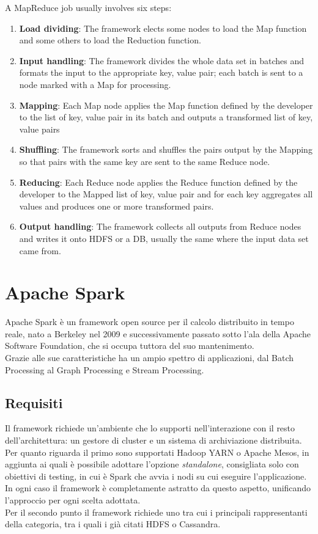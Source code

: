 A MapReduce job usually involves six steps:

\begin{enumerate}
	\item \textbf{Load dividing}: The framework elects some nodes to load the Map function and some others to load the Reduction function.
	\item \textbf{Input handling}: The framework divides the whole data set in batches and formats the input to the appropriate key, value pair; each batch is sent to a node marked with a Map for processing.
	\item \textbf{Mapping}: Each Map node applies the Map function defined by the developer to the list of key, value pair in its batch and outputs a transformed list of key, value pairs
	\item \textbf{Shuffling}: The framework sorts and shuffles the pairs output by the Mapping so that pairs with the same key are sent to the same Reduce node.
	\item \textbf{Reducing}: Each Reduce node applies the Reduce function defined by the developer to the Mapped list of key, value pair and for each key aggregates all values and produces one or more transformed pairs.
	\item \textbf{Output handling}: The framework collects all outputs from Reduce nodes and writes it onto HDFS or a DB, usually the same where the input data set came from.
\end{enumerate}

 \pagebreak
 
\section{Apache Spark} \label{Spark}

Apache Spark è un framework open source per il calcolo distribuito in tempo reale, nato a Berkeley nel 2009 e successivamente passato sotto l'ala della Apache Software Foundation, che si occupa tuttora del suo mantenimento.\\ Grazie alle sue caratteristiche ha un ampio spettro di applicazioni, dal Batch Processing al Graph Processing e Stream Processing.
\subsection{Requisiti} 
Il framework richiede un'ambiente che lo supporti nell'interazione con il resto dell'architettura: un gestore di cluster e un sistema di archiviazione distribuita.\\ 
Per quanto riguarda il primo sono supportati Hadoop YARN o Apache Mesos, in aggiunta ai quali è possibile adottare l'opzione \textit{standalone}, consigliata solo con obiettivi di testing, in cui è Spark che avvia i nodi su cui eseguire l'applicazione. In ogni caso il framework è completamente astratto da questo aspetto, unificando l'approccio per ogni scelta adottata.\\
Per il secondo punto il framework richiede uno tra cui i principali rappresentanti della categoria, tra i quali i già citati HDFS o Cassandra.\\ 

